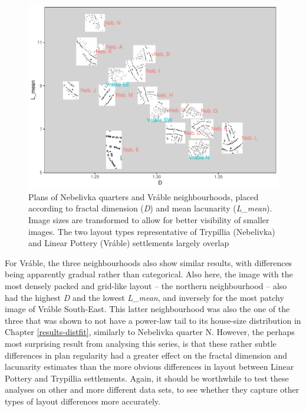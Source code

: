 \documentclass[
  12pt,
  a4paper, twoside]{book}
\begin{document}
\begin{figure}

{\centering \includegraphics[width=0.9\linewidth]{Results/fig09_quarters} 

}

\caption[Quarter and neighbourhood plans, plotted by D and L\_mean estimates]{Plans of Nebelivka quarters and Vráble neighbourhoods, placed according to fractal dimension (\emph{D}) and mean lacunarity (\emph{L\_mean}). Image sizes are transformed to allow for better visibility of smaller images. The two layout types representative of Trypillia (Nebelivka) and Linear Pottery (Vráble) settlements largely overlap}\label{fig:09-quarters}
\end{figure}

For Vráble, the three neighbourhoods also show similar results, with differences being apparently gradual rather than categorical. Also here, the image with the most densely packed and grid-like layout -- the northern neighbourhood -- also had the highest \emph{D} and the lowest \emph{L\_mean}, and inversely for the most patchy image of Vráble South-East. This latter neighbourhood was also the one of the three that was shown to not have a power-law tail to its house-size distribution in Chapter \ref{results-distfit}, similarly to Nebelivka quarter N. However, the perhaps most surprising result from analysing this series, is that these rather subtle differences in plan regularity had a greater effect on the fractal dimension and lacunarity estimates than the more obvious differences in layout between Linear Pottery and Trypillia settlements. Again, it should be worthwhile to test these analyses on other and more different data sets, to see whether they capture other types of layout differences more accurately.
\end{document}
